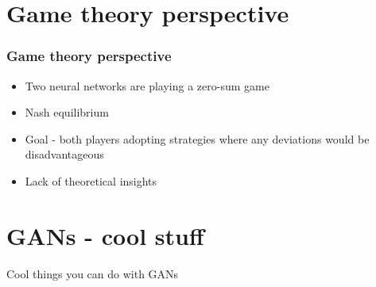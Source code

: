 \documentclass{Bredelebeamer}
\begin{document}
\section{Game theory perspective}
\begin{frame}
	\frametitle{Game theory perspective}
	\begin{itemize}[<+->]
		\item Two neural networks are playing a zero-sum game
		\item Nash equilibrium
		\item Goal - both players adopting strategies where any deviations would be disadvantageous
		\item Lack of theoretical insights
	\end{itemize}
\end{frame}


\section{GANs - cool stuff}
\begin{frame}
	\begin{center}
	\Huge{Cool things you can do with GANs}
	\end{center}
\end{frame}

\end{document}

